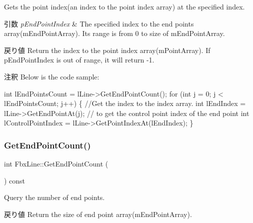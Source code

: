 Gets the point index(an index to the point index array) at the specified index. 
\begin{DoxyParams}{引数}
{\em p\+End\+Point\+Index} & The specified index to the end points array(m\+End\+Point\+Array). Its range is from 0 to size of m\+End\+Point\+Array. \\
\hline
\end{DoxyParams}
\begin{DoxyReturn}{戻り値}
Return the index to the point index array(m\+Point\+Array). If p\+End\+Point\+Index is out of range, it will return -\/1. 
\end{DoxyReturn}
\begin{DoxyRemark}{注釈}
Below is the code sample\+: 
\begin{DoxyCode}
\textcolor{keywordtype}{int} lEndPointsCount = lLine->GetEndPointCount();
\textcolor{keywordflow}{for} (\textcolor{keywordtype}{int} j = 0; j < lEndPointsCount; j++)
\{
    \textcolor{comment}{//Get the index to the index array. }
    \textcolor{keywordtype}{int} lEndIndex = lLine->GetEndPointAt(j);
    \textcolor{comment}{// to get the control point index of the end point}
    \textcolor{keywordtype}{int} lControlPointIndex = lLine->GetPointIndexAt(lEndIndex);
\}
\end{DoxyCode}
 
\end{DoxyRemark}
\mbox{\label{class_fbx_line_a629b16ba4261ed6fdd77d8ae769f4026}} 
\subsubsection{\texorpdfstring{Get\+End\+Point\+Count()}{GetEndPointCount()}}
{\footnotesize\ttfamily int Fbx\+Line\+::\+Get\+End\+Point\+Count (\begin{DoxyParamCaption}{ }\end{DoxyParamCaption}) const}

Query the number of end points. \begin{DoxyReturn}{戻り値}
Return the size of end point array(m\+End\+Point\+Array). 
\end{DoxyReturn}
\mbox{\label{class_fbx_line_abbb803913ad6eeb89e79eb3d9f58d3c2}} 
